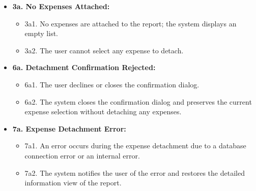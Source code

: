 \begin{itemize} [label={}, leftmargin=0.75cm, noitemsep]

    \item \textbf{3a. No Expenses Attached:}
    \begin{itemize} [label={}, leftmargin=0.75cm, noitemsep]
        \item 3a1. No expenses are attached to the report; the system displays an empty list.
        \item 3a2. The user cannot select any expense to detach.
    \end{itemize}

    \item \textbf{6a. Detachment Confirmation Rejected:}
    \begin{itemize} [label={}, leftmargin=0.75cm, noitemsep]
        \item 6a1. The user declines or closes the confirmation dialog.
        \item 6a2. The system closes the confirmation dialog and preserves the current expense selection without detaching any expenses.
    \end{itemize}

    \item \textbf{7a. Expense Detachment Error:}
    \begin{itemize} [label={}, leftmargin=0.75cm, noitemsep]
        \item 7a1. An error occurs during the expense detachment due to a database connection error or an internal error.
        \item 7a2. The system notifies the user of the error and restores the detailed information view of the report.
    \end{itemize}

\end{itemize}

\vspace{0.3cm}
